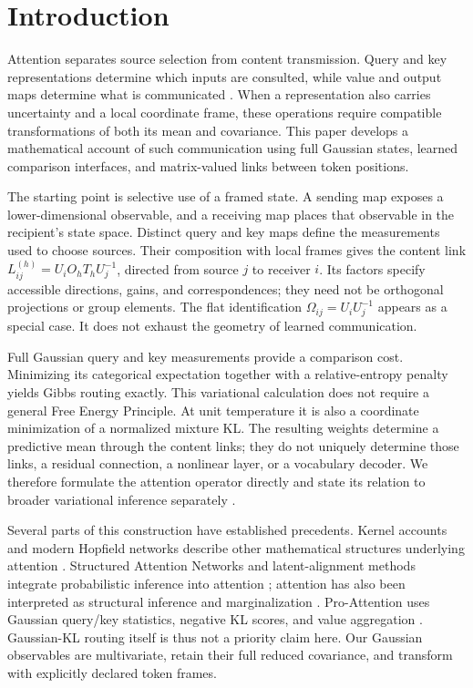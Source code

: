 \documentclass[twoside,11pt]{article}
\begin{document}
\section{Introduction}

Attention separates source selection from content transmission. Query and key representations determine which inputs are consulted, while value and output maps determine what is communicated \citep{vaswani2017attention}. When a representation also carries uncertainty and a local coordinate frame, these operations require compatible transformations of both its mean and covariance. This paper develops a mathematical account of such communication using full Gaussian states, learned comparison interfaces, and matrix-valued links between token positions.

The starting point is selective use of a framed state. A sending map exposes a lower-dimensional observable, and a receiving map places that observable in the recipient's state space. Distinct query and key maps define the measurements used to choose sources. Their composition with local frames gives the content link
\(L_{ij}^{(h)}=U_iO_hT_hU_j^{-1}\), directed from source \(j\) to receiver \(i\).
Its factors specify accessible directions, gains, and correspondences; they need not be orthogonal projections or group elements. The flat identification \(\Omega_{ij}=U_iU_j^{-1}\) appears as a special case. It does not exhaust the geometry of learned communication.

Full Gaussian query and key measurements provide a comparison cost. Minimizing its categorical expectation together with a relative-entropy penalty yields Gibbs routing exactly. This variational calculation does not require a general Free Energy Principle. At unit temperature it is also a coordinate minimization of a normalized mixture KL. The resulting weights determine a predictive mean through the content links; they do not uniquely determine those links, a residual connection, a nonlinear layer, or a vocabulary decoder. We therefore formulate the attention operator directly and state its relation to broader variational inference separately \citep{Blei2017}.

Several parts of this construction have established precedents. Kernel accounts and modern Hopfield networks describe other mathematical structures underlying attention \citep{tsai2019transformer,katharopoulos2020transformers,ramsauer2021hopfield}. Structured Attention Networks and latent-alignment methods integrate probabilistic inference into attention \citep{Kim2017StructuredAttention,Deng2018LatentAlignment,Bahuleyan2018VariationalAttention}; attention has also been interpreted as structural inference and marginalization \citep{Singh2023ImplicitStructuralInference,Singh2023MarginalProbability}. Pro-Attention uses Gaussian query/key statistics, negative KL scores, and value aggregation \citep{Bae2022ProAttention}. Gaussian-KL routing itself is thus not a priority claim here. Our Gaussian observables are multivariate, retain their full reduced covariance, and transform with explicitly declared token frames.
\end{document}

